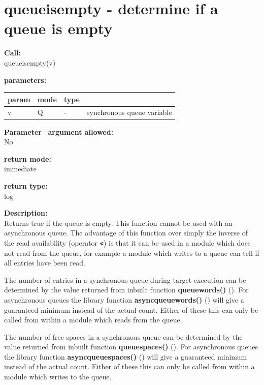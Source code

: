     \section{queueisempty - determine if a queue is empty}\label{sec:ifqueueisempty}
        
        {\bf Call:} \\
        queueisempty(v)
        
        {\bf parameters:} \\
        \begin{tabular}{| l | l | l | l |}
        \hline
        param  & mode & type & \\
        \hline \hline
        v & Q & - & synchronous queue variable \\ \hline
        \end{tabular}
        
        {\bf Parameter=argument allowed:} \\
        No
        
        {\bf return mode:} \\
        immediate

        {\bf return type:} \\
        log
        
        {\bf Description:} \\
        Returns true if the queue is empty. This function cannot be used with an asynchronous
        queue. The advantage of this function over simply the inverse of the
        read availability (operator {\bf \verb'<'}) is that it can be used
        in a module which does not read from the queue, for example a module
        which writes to a queue can tell if all entries have been read.
        
        The number of entries in a synchronous queue during target execution can
        be determined by the value returned from inbuilt function {\bf
        queuewords()} (). For asynchronous queues the
        library function {\bf asyncqueuewords()}
        () will give a guaranteed minimum
        instead of the actual count. Either of these this can only be called
        from within a module which reads from the queue.
        
        The number of free spaces in a synchronous queue can be determined
        by the value returned from inbuilt function {\bf queuespaces()}
        (). For asynchronous queues the
        library function {\bf asyncqueuespaces()}
        () will give a guaranteed minimum
        instead of the actual count. Either of these this can only be called
        from within a module which writes to the queue.
 

